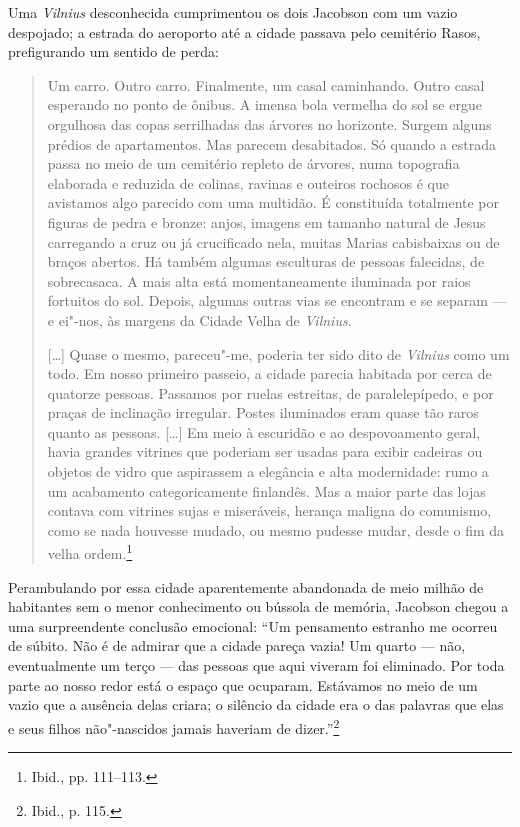 Uma \textit{Vilnius} desconhecida cumprimentou os dois Jacobson com um vazio
despojado; a estrada do aeroporto até a cidade passava pelo cemitério
Rasos, prefigurando um sentido de perda:

\begin{quote}
Um carro. Outro carro. Finalmente, um casal caminhando. Outro casal
esperando no ponto de ônibus. A imensa bola vermelha do sol se ergue
orgulhosa das copas serrilhadas das árvores no horizonte. Surgem alguns
prédios de apartamentos. Mas parecem desabitados. Só quando a estrada
passa no meio de um cemitério repleto de árvores, numa topografia
elaborada e reduzida de colinas, ravinas e outeiros rochosos é que
avistamos algo parecido com uma multidão. É constituída totalmente por
figuras de pedra e bronze: anjos, imagens em tamanho natural de Jesus
carregando a cruz ou já crucificado nela, muitas Marias cabisbaixas ou
de braços abertos. Há também algumas esculturas de pessoas falecidas, de
sobrecasaca. A mais alta está momentaneamente iluminada por raios
fortuitos do sol. Depois, algumas outras vias se encontram e se separam
--- e ei"-nos, às margens da Cidade Velha de \textit{Vilnius}.

[\ldots{}] Quase o mesmo, pareceu"-me, poderia ter sido dito de \textit{Vilnius} como
um todo. Em nosso primeiro passeio, a cidade parecia habitada por cerca
de quatorze pessoas. Passamos por ruelas estreitas, de paralelepípedo, e
por praças de inclinação irregular. Postes iluminados eram quase tão
raros quanto as pessoas. [\ldots{}] Em meio à escuridão e ao despovoamento
geral, havia grandes vitrines que poderiam ser usadas para exibir
cadeiras ou objetos de vidro que aspirassem a elegância e alta
modernidade: rumo a um acabamento categoricamente finlandês. Mas a maior
parte das lojas contava com vitrines sujas e miseráveis, herança maligna
do comunismo, como se nada houvesse mudado, ou mesmo pudesse mudar,
desde o fim da velha ordem.\footnote{Ibid., pp. 111--113.}
\end{quote}

Perambulando por essa cidade aparentemente abandonada de meio milhão de
habitantes sem o menor conhecimento ou bússola de memória, Jacobson
chegou a uma surpreendente conclusão emocional: ``Um pensamento estranho
me ocorreu de súbito. Não é de admirar que a cidade pareça vazia! Um
quarto --- não, eventualmente um terço --- das pessoas que aqui viveram foi
eliminado. Por toda parte ao nosso redor está o espaço que ocuparam.
Estávamos no meio de um vazio que a ausência delas criara; o silêncio da
cidade era o das palavras que elas e seus filhos não"-nascidos jamais
haveriam de dizer.''\footnote{Ibid., p. 115.}

